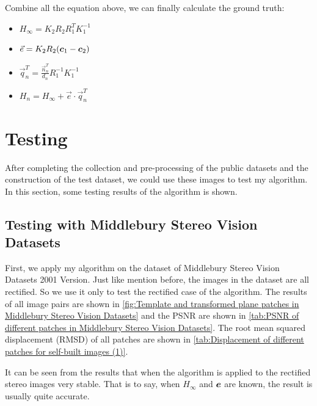 Combine all the equation above, we can finally calculate the ground truth: 
\begin{itemize}
	\item $H_{\infty}=K_{2}R_{2}R_{1}^{T}K_{1}^{-1}$
	\item $\vec{e}=K_{2}R_{2}(\boldsymbol{c}_{1}-\boldsymbol{c}_{2})$
	\item $\vec{q}_{n}^T=\frac{\vec{n}_n^{T}}{d_n}R_{1}^{-1}K_{1}^{-1}$
	\item $ H_{n} = H_{\infty} + \vec{e} \cdot \vec{q}_{n}^T$
\end{itemize}

\section{Testing}
After completing the collection and pre-processing of the public datasets and the construction of the test dataset, we could use these images to test my algorithm. In this section, some testing results of the algorithm is shown.
\subsection{Testing with Middlebury Stereo Vision Datasets}\label{subsec:Testing with Middlebury Stereo Vision Datasets}
First, we apply my algorithm on the dataset of Middlebury Stereo Vision Datasets 2001 Version. Just like mention before, the images in the dataset are all rectified. So we use it only to test the rectified case of the algorithm. The results of all image pairs are shown in \cref{fig:Template and transformed plane patches in Middlebury Stereo Vision Datasets} and the PSNR are shown in \cref{tab:PSNR of different patches in  Middlebury Stereo Vision Datasets}. The root mean squared displacement (RMSD) of all patches are shown in \cref{tab:Displacement of different patches for self-built images (1)}.

It can be seen from the results that when the algorithm is applied to the rectified stereo images very stable. That is to say, when $H_{\infty}$ and $\boldsymbol{e}$ are known, the result is usually quite accurate. 

